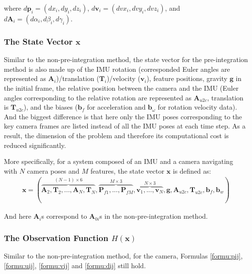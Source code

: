 \documentclass[12pt]{article}   %
\begin{document}
where $d\textbf{p}_{i} = (dx_{i}, dy_{i}, dz_{i})$, $d\textbf{v}_{i} = (dvx_{i}, dvy_{i}, dvz_{i})$, and
$d\textbf{A}_{i} = (d\alpha_{i}, d\beta_{i}, d\gamma_{i}) $.

\subsubsection{The State Vector $\textbf{x}$}

Similar to the non-pre-integration method, the state vector for the pre-integration method is also made up of the IMU rotation (corresponded Euler angles are represented as $\textbf{A}_{i}$)/translation ($\textbf{T}_{i}$)/velocity ($\textbf{v}_{i}$), feature positions, gravity $\textbf{g}$ in the initial frame, the relative position between the camera and the IMU (Euler angles corresponding to the relative rotation are represented as $\textbf{A}_{u2c}$, translation is $\textbf{T}_{u2c}$), and the biases ($\textbf{b}_{f}$ for acceleration and $\textbf{b}_{\omega}$ for rotation velocity data). And the biggest difference is that here only the IMU poses corresponding to  the key camera frames are listed instead of all the IMU poses at each time step. As a result, the dimension of the problem and therefore its computational cost is reduced significantly.

More specifically, for a system composed of an IMU and a camera navigating with $N$ camera poses and $M$ features, the state vector $\textbf{x}$ is defined as:
\begin{align}
\textbf{x} = (\overbrace{\textbf{A}_{2}, \textbf{T}_{2}, ... , \textbf{A}_{N}, \textbf{T}_{N}}^{(N - 1) \times 6}, \overbrace{\textbf{P}_{f1}, ..., \textbf{P}_{fM}}^{M \times 3}, \overbrace{\textbf{v}_1, ..., \textbf{v}_{N}}^{N \times 3},  \textbf{g}, \textbf{A}_{u2c}, \textbf{T}_{u2c}, \textbf{b}_f, \textbf{b}_w) 
\end{align}

And here $\textbf{A}_{i}$s correspond to $\textbf{A}_{0i}$s in the non-pre-integration method.

\subsubsection{The Observation Function $H(\textbf{x})$}

Similar to the non-pre-integration method, for the camera, Formulas \ref{formu:pij}, \ref{formu:uij}, \ref{formu:vij} and \ref{formu:dij} still hold.

\end{document}
